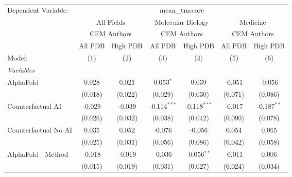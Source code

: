 \begingroup
\centering
\begin{tabular}{lcccccc}
   \tabularnewline \midrule \midrule
   Dependent Variable: & \multicolumn{6}{c}{mean\_tmscore}\\
 & \multicolumn{2}{c}{All Fields} & \multicolumn{2}{c}{Molecular Biology} & \multicolumn{2}{c}{Medicine} \\
\cmidrule(lr){2-3} \cmidrule(lr){4-5} \cmidrule(lr){6-7}
 & \multicolumn{2}{c}{CEM Authors} & \multicolumn{2}{c}{CEM Authors} & \multicolumn{2}{c}{CEM Authors} \\
\cmidrule(lr){2-3} \cmidrule(lr){4-5} \cmidrule(lr){6-7}
 & \multicolumn{1}{c}{All PDB} & \multicolumn{1}{c}{High PDB} & \multicolumn{1}{c}{All PDB} & \multicolumn{1}{c}{High PDB} & \multicolumn{1}{c}{All PDB} & \multicolumn{1}{c}{High PDB} \\
\cmidrule(lr){2-2} \cmidrule(lr){3-3} \cmidrule(lr){4-4} \cmidrule(lr){5-5} \cmidrule(lr){6-6} \cmidrule(lr){7-7}
   Model:                                                     & (1)     & (2)           & (3)            & (4)            & (5)       & (6)\\  
   \midrule
   \emph{Variables}\\
   AlphaFold                                                  & 0.028   & 0.021         & 0.053$^{*}$    & 0.039          & -0.051    & -0.056\\   
                                                              & (0.018) & (0.022)       & (0.029)        & (0.030)        & (0.071)   & (0.086)\\   
   Counterfactual AI                                          & -0.029  & -0.039        & -0.114$^{***}$ & -0.118$^{***}$ & -0.017    & -0.187$^{**}$\\   
                                                              & (0.026) & (0.032)       & (0.038)        & (0.042)        & (0.090)   & (0.078)\\   
   Counterfactual No AI                                       & 0.035   & 0.052         & -0.076         & -0.056         & 0.054     & 0.065\\   
                                                              & (0.025) & (0.031)       & (0.056)        & (0.086)        & (0.042)   & (0.058)\\   
   AlphaFold - Method                                         & -0.018  & -0.019        & -0.036         & -0.056$^{**}$  & -0.011    & 0.006\\   
                                                              & (0.015) & (0.019)       & (0.031)        & (0.027)        & (0.024)   & (0.034)\\   

\end{tabular}

